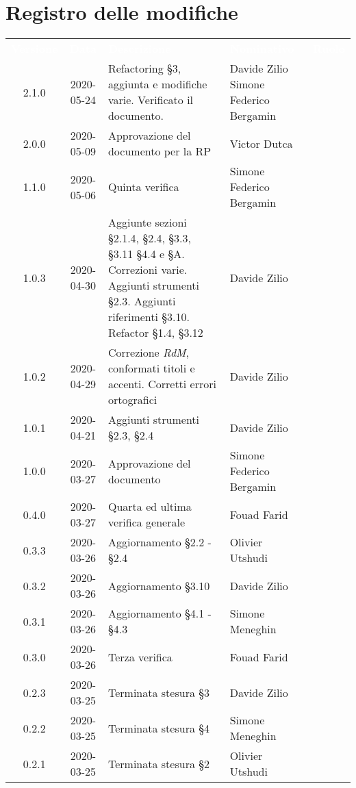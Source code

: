 \section*{Registro delle modifiche}
{
	\centering
	\begin{longtable}{ c c  C{4cm}  C{3cm}  C{3.5cm} }
		\textcolor{white}{\textbf{Versione}} & \textcolor{white}{\textbf{Data}} & \textcolor{white}{\textbf{Descrizione}} & \textcolor{white}{\textbf{Nominativo}} & \textcolor{white}{\textbf{Ruolo}}\\
		2.1.0 & 2020-05-24 & Refactoring \S 3, aggiunta e modifiche varie. Verificato il documento. & Davide Zilio \newline Simone Federico Bergamin & \adm{} \newline  \ver{} \\
	2.0.0 & 2020-05-09 & Approvazione del documento per la RP & Victor Dutca &\Res{}\\
	1.1.0 & 2020-05-06 & Quinta verifica & Simone Federico Bergamin &\ver{}\\
	1.0.3 & 2020-04-30 & Aggiunte sezioni \S 2.1.4, \S 2.4, \S 3.3, \S 3.11 \S 4.4 e \S A. Correzioni varie. Aggiunti strumenti \S 2.3. Aggiunti riferimenti \S 3.10. Refactor \S 1.4, \S 3.12 & Davide Zilio &\adm{} \\
	1.0.2 & 2020-04-29 & Correzione \textit{RdM}, conformati titoli e accenti. Corretti errori ortografici & Davide Zilio &\adm{} \\
	1.0.1 & 2020-04-21 & Aggiunti strumenti \S 2.3, \S 2.4 & Davide Zilio &\adm{} \\	
    1.0.0 & 2020-03-27 & Approvazione del documento & Simone Federico Bergamin &\Res{} \\
    	0.4.0 & 2020-03-27 & Quarta ed ultima verifica generale & Fouad Farid &\ver{}\\
    	0.3.3 & 2020-03-26 & Aggiornamento \S 2.2 - \S 2.4 & Olivier Utshudi &\adm{}\\
		0.3.2 & 2020-03-26 & Aggiornamento \S 3.10 & Davide Zilio &\adm{}\\
		0.3.1 & 2020-03-26 & Aggiornamento \S 4.1 - \S 4.3  & Simone Meneghin &\adm{}\\
		0.3.0 & 2020-03-26 & Terza verifica & Fouad Farid &\ver{}\\
		0.2.3 & 2020-03-25 & Terminata stesura \S 3  & Davide Zilio &\adm{}\\
    	0.2.2 & 2020-03-25 & Terminata stesura \S 4 & Simone Meneghin &\adm{}\\	
   		0.2.1 & 2020-03-25 & Terminata stesura \S 2 & Olivier Utshudi &\adm{}\\

\end{longtable}}
